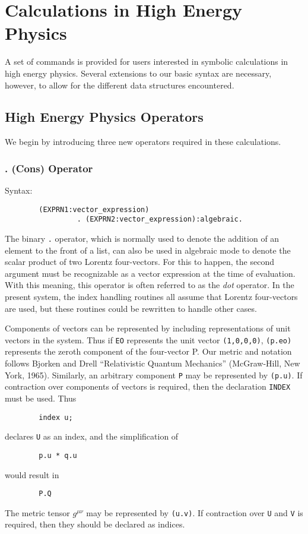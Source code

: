 \chapter{Calculations in High Energy Physics}

A set of {\REDUCE} commands is provided for users interested in symbolic
calculations in high energy physics. Several extensions to our basic
syntax are necessary, however, to allow for the different data structures
encountered.

\section{High Energy Physics Operators}
\label{HEPHYS}
\hypertarget{command:INDEX}{}

We begin by introducing three new operators required in these calculations.

\subsection{. (Cons) Operator}
Syntax:
\begin{verbatim}
        (EXPRN1:vector_expression)
                 . (EXPRN2:vector_expression):algebraic.
\end{verbatim}
The binary \texttt{.} operator, which is normally used to denote the addition
of an element to the front of a list, can also be used in algebraic mode
to denote the scalar product of two Lorentz four-vectors.  For this to
happen, the second argument must be recognizable as a vector expression
 at the time of
evaluation.  With this meaning, this operator is often referred to as the
\emph{dot} operator.  In the present system, the index handling routines all
assume that Lorentz four-vectors are used, but these routines could be
rewritten to handle other cases.

Components of vectors can be represented by including representations of
unit vectors in the system.  Thus if \texttt{EO} represents the unit vector
\texttt{(1,0,0,0)}, \texttt{(p.eo)} represents the zeroth component of the
four-vector P.  Our metric and notation follows Bjorken and Drell
``Relativistic Quantum Mechanics'' (McGraw-Hill, New York, 1965).
Similarly, an arbitrary component \texttt{P} may be represented by
\texttt{(p.u)}.  If contraction over components of vectors is required, then
the declaration \texttt{INDEX} must be used.  Thus
\begin{verbatim}
        index u;
\end{verbatim}
declares \texttt{U} as an index, and the simplification of
\begin{verbatim}
        p.u * q.u
\end{verbatim}
would result in
\begin{verbatim}
        P.Q
\end{verbatim}
The metric tensor $g^{\mu \nu}$ may be represented by \texttt{(u.v)}.  If
contraction over \texttt{U} and \texttt{V} is required, then they should be
declared as indices.

